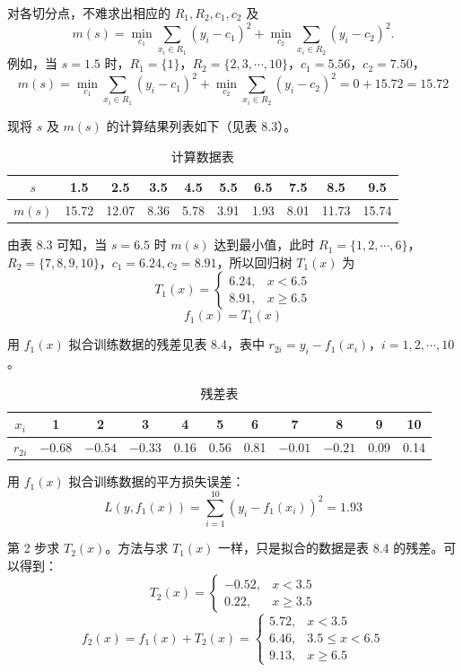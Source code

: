 \documentclass[UTF8,12pt,a4paper,fontset=fandol]{ctexart}
\begin{document}
对各切分点，不难求出相应的 $R_1,R_2,c_1,c_2$ 及
\[
m(s)=\min_{c_1}\sum_{x_i\in R_1}(y_i-c_1)^2
+\min_{c_2}\sum_{x_i\in R_2}(y_i-c_2)^2.
\]
例如，当 $s=1.5$ 时，$R_1=\{1\}$，$R_2=\{2,3,\cdots,10\}$，$c_1=5.56$，$c_2=7.50$，
\[
m(s)=\min_{c_1}\sum_{x_i\in R_1}(y_i-c_1)^2
+\min_{c_2}\sum_{x_i\in R_2}(y_i-c_2)^2=0+15.72=15.72
\]

现将 $s$ 及 $m(s)$ 的计算结果列表如下（见表 8.3）。

\begin{table}[htbp]
\centering
\caption{计算数据表}
\begin{tabular}{c*{9}{c}}
\toprule
$s$ & 1.5 & 2.5 & 3.5 & 4.5 & 5.5 & 6.5 & 7.5 & 8.5 & 9.5\\
\midrule
$m(s)$ & 15.72 & 12.07 & 8.36 & 5.78 & 3.91 & 1.93 & 8.01 & 11.73 & 15.74\\
\bottomrule
\end{tabular}
\end{table}

由表 8.3 可知，当 $s=6.5$ 时 $m(s)$ 达到最小值，此时 $R_1=\{1,2,\cdots,6\}$，$R_2=\{7,8,9,10\}$，$c_1=6.24,c_2=8.91$，所以回归树 $T_1(x)$ 为
\[
T_1(x)=
\begin{cases}
6.24, & x<6.5\\
8.91, & x\geq 6.5
\end{cases}
\]
\[
f_1(x)=T_1(x)
\]

用 $f_1(x)$ 拟合训练数据的残差见表 8.4，表中 $r_{2i}=y_i-f_1(x_i)$，$i=1,2,\cdots,10$。

\begin{table}[htbp]
\centering
\caption{残差表}
\begin{tabular}{c*{10}{c}}
\toprule
$x_i$ & 1 & 2 & 3 & 4 & 5 & 6 & 7 & 8 & 9 & 10\\
\midrule
$r_{2i}$ & $-0.68$ & $-0.54$ & $-0.33$ & 0.16 & 0.56 & 0.81 & $-0.01$ & $-0.21$ & 0.09 & 0.14\\
\bottomrule
\end{tabular}
\end{table}

用 $f_1(x)$ 拟合训练数据的平方损失误差：
\[
L(y,f_1(x))=\sum_{i=1}^{10}(y_i-f_1(x_i))^2=1.93
\]

第 2 步求 $T_2(x)$。方法与求 $T_1(x)$ 一样，只是拟合的数据是表 8.4 的残差。可以得到：
\[
T_2(x)=
\begin{cases}
-0.52, & x<3.5\\
0.22, & x\geq 3.5
\end{cases}
\]
\[
f_2(x)=f_1(x)+T_2(x)=
\begin{cases}
5.72, & x<3.5\\
6.46, & 3.5\leq x<6.5\\
9.13, & x\geq 6.5
\end{cases}
\]
\end{document}
